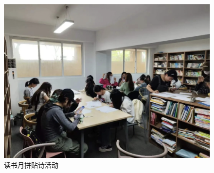 \documentclass{article}
\begin{document}
\begin{figure}[H]
\begin{minipage}[b]{0.45\textwidth}
        \includegraphics[width=\textwidth]{Figure5.png} %
        \caption{读书月拼贴诗活动}
        \label{fig:image2}
    \end{minipage}
\end{figure}
\end{document}
